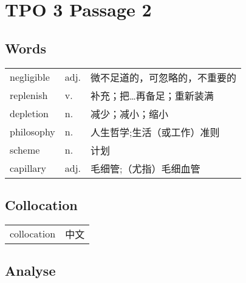 \section{TPO 3 Passage 2}

\subsection{Words}

\begin{tabular}{lll}
    negligible & adj. & 微不足道的，可忽略的，不重要的 \\
    replenish  & v.   & 补充；把…再备足；重新装满   \\
    depletion  & n.   & 减少；减小；缩小        \\
    philosophy & n.   & 人生哲学;生活（或工作）准则  \\
    scheme     & n.   & 计划              \\
    capillary  & adj. & 毛细管;（尤指）毛细血管    \\
\end{tabular}

\subsection{Collocation}

\begin{tabular}{ll}
    collocation & 中文 \\
\end{tabular}

\subsection{Analyse}

